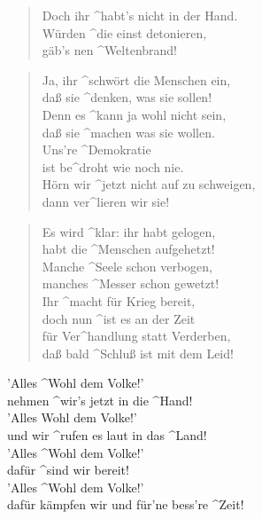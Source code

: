 \documentclass{leadsheet}
\begin{document}
\begin{song}
\begin{multicols}{2}
\begin{verse}
  Doch ihr ^habt's nicht in der Hand. \\
  Würden ^die einst detonieren, \\
  gäb's nen ^Weltenbrand! \\
  \end{verse}
  \begin{chorus}[after-label=]\end{chorus}
  \begin{verse} 
  Ja, ihr ^schwört die Menschen ein, \\
  daß sie ^denken, was sie  sollen! \\
  Denn es ^kann ja wohl nicht sein, \\
  daß sie ^machen was sie wollen. \\
  Uns're ^Demokratie \\
  ist be^droht wie noch nie. \\
  Hörn wir ^jetzt nicht auf zu schweigen, \\
  dann ver^lieren wir sie! \\
  \end{verse}  
  \begin{verse} 
  Es wird ^klar: ihr habt gelogen, \\
  habt die ^Menschen aufgehetzt! \\
  Manche ^Seele schon verbogen, \\
  manches ^Messer schon gewetzt! \\
    Ihr ^macht für Krieg bereit, \\
  doch nun ^ist es an der Zeit  \\
  für Ver^handlung statt Verderben, \\
  daß bald ^Schluß ist mit dem Leid! \\
  \end{verse}  
  \begin{chorus}[format={\itshape}]
  'Alles ^Wohl dem Volke!' \\
  nehmen ^wir's jetzt in die ^Hand! \\
  'Alles Wohl dem Volke!' \\
  und wir ^rufen es laut in das ^Land! \\
  'Alles ^Wohl dem Volke!' \\
  dafür ^sind wir bereit! \\
 'Alles ^Wohl dem Volke!' \\
  dafür kämpfen wir und für'ne bess're ^Zeit! \\
  \end{chorus}  
  \end{multicols}
\end{song}
\end{document}
